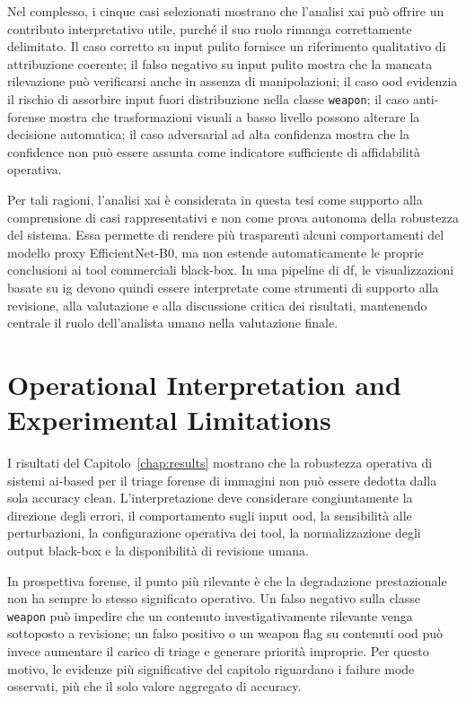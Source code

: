 Nel complesso, i cinque casi selezionati mostrano che l'analisi \gls{xai} può
offrire un contributo interpretativo utile, purché il suo ruolo rimanga
correttamente delimitato. Il caso corretto su input pulito fornisce un riferimento
qualitativo di attribuzione coerente; il falso negativo su input pulito mostra che
la mancata rilevazione può verificarsi anche in assenza di manipolazioni; il caso
\gls{ood} evidenzia il rischio di assorbire input fuori distribuzione nella
classe \texttt{weapon}; il caso anti-forense mostra che trasformazioni visuali a
basso livello possono alterare la decisione automatica; il caso adversarial ad
alta confidenza mostra che la confidence non può essere assunta come indicatore
sufficiente di affidabilità operativa.

Per tali ragioni, l'analisi \gls{xai} è considerata in questa tesi come supporto
alla comprensione di casi rappresentativi e non come prova autonoma della
robustezza del sistema. Essa permette di rendere più trasparenti alcuni
comportamenti del modello proxy EfficientNet-B0, ma non estende automaticamente
le proprie conclusioni ai tool commerciali black-box. In una pipeline di
\gls{df}, le visualizzazioni basate su \gls{ig} devono quindi essere interpretate
come strumenti di supporto alla revisione, alla valutazione e alla discussione
critica dei risultati, mantenendo centrale il ruolo dell'analista umano nella
valutazione finale.


\section{Operational Interpretation and Experimental Limitations}
\label{sec:results-implications}

I risultati del Capitolo~\ref{chap:results} mostrano che la robustezza operativa
di sistemi \gls{ai}-based per il triage forense di immagini non può essere
dedotta dalla sola accuracy clean. L'interpretazione deve considerare
congiuntamente la direzione degli errori, il comportamento sugli input \gls{ood},
la sensibilità alle perturbazioni, la configurazione operativa dei tool, la
normalizzazione degli output black-box e la disponibilità di revisione umana.

In prospettiva forense, il punto più rilevante è che la degradazione prestazionale
non ha sempre lo stesso significato operativo. Un falso negativo sulla classe
\texttt{weapon} può impedire che un contenuto investigativamente rilevante venga
sottoposto a revisione; un falso positivo o un weapon flag su contenuti \gls{ood}
può invece aumentare il carico di triage e generare priorità improprie. Per
questo motivo, le evidenze più significative del capitolo riguardano i failure
mode osservati, più che il solo valore aggregato di accuracy.

